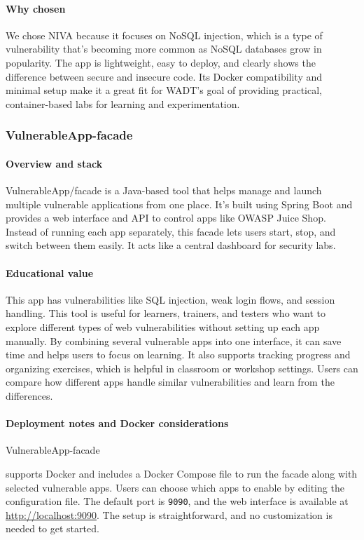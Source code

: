 \documentclass[12pt,titlepage]{article}
\begin{document}
\paragraph{Why chosen}
We chose NIVA because it focuses on NoSQL injection, which is a type of vulnerability that’s becoming more common as NoSQL databases grow in popularity. The app is lightweight, easy to deploy, and clearly shows the difference between secure and insecure code. Its Docker compatibility and minimal setup make it a great fit for WADT’s goal of providing practical, container-based labs for learning and experimentation.

\subsubsection{VulnerableApp-facade}

\paragraph{Overview and stack}
VulnerableApp\-/facade is a Java-based tool that helps manage and launch multiple vulnerable applications from one place. It’s built using Spring Boot and provides a web interface and API to control apps like OWASP Juice Shop. Instead of running each app separately, this facade lets users start, stop, and switch between them easily. It acts like a central dashboard for security labs.

\paragraph{Educational value}
This app has vulnerabilities like SQL injection, weak login flows, and session handling. This tool is useful for learners, trainers, and testers who want to explore different types of web vulnerabilities without setting up each app manually. By combining several vulnerable apps into one interface, it can save time and helps users to focus on learning. It also supports tracking progress and organizing exercises, which is helpful in classroom or workshop settings. Users can compare how different apps handle similar vulnerabilities and learn from the differences.

\paragraph{Deployment notes and Docker considerations}
VulnerableApp-facade

supports Docker and includes a Docker Compose file to run the facade along with selected vulnerable apps. Users can choose which apps to enable by editing the configuration file. The default port is \texttt{9090}, and the web interface is available at \url{http://localhost:9090}. The setup is straightforward, and no customization is needed to get started. 
\end{document}
